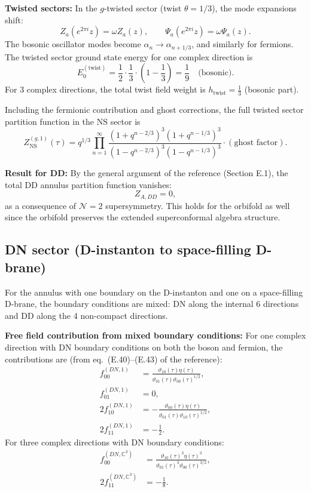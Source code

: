 \documentclass[11pt]{article}
\newcommand{\C}{\mathbb{C}}
\newcommand{\vt}{\vartheta}
\newcommand{\NN}{\mathcal{N}}
\begin{document}
\textbf{Twisted sectors:} In the $g$-twisted sector (twist $\theta = 1/3$), the mode expansions shift:
\begin{equation}
Z_a(e^{2\pi i} z) = \omega Z_a(z), \qquad \Psi_a(e^{2\pi i} z) = \omega \Psi_a(z).
\end{equation}
The bosonic oscillator modes become $\alpha_n \to \alpha_{n+1/3}$, and similarly for fermions. The twisted sector ground state energy for one complex direction is
\begin{equation}
E_0^{(\text{twist})} = \frac{1}{2} \cdot \frac{1}{3} \cdot \left(1 - \frac{1}{3}\right) = \frac{1}{9} \quad \text{(bosonic)}.
\end{equation}
For 3 complex directions, the total twist field weight is $h_{\text{twist}} = \frac{1}{3}$ (bosonic part).

Including the fermionic contribution and ghost corrections, the full twisted sector partition function in the NS sector is
\begin{equation}
Z^{(g,1)}_{\text{NS}}(\tau) = q^{1/3} \prod_{n=1}^\infty \frac{(1 + q^{n-2/3})^3(1 + q^{n-1/3})^3}{(1-q^{n-2/3})^3(1-q^{n-1/3})^3} \cdot (\text{ghost factor}).
\end{equation}

\textbf{Result for DD:} By the general argument of the reference (Section E.1), the total DD annulus partition function vanishes:
\begin{equation}
Z_{A,DD} = 0,
\end{equation}
as a consequence of $\NN=2$ supersymmetry. This holds for the orbifold as well since the orbifold preserves the extended superconformal algebra structure.

\subsection{DN sector (D-instanton to space-filling D-brane)}

For the annulus with one boundary on the D-instanton and one on a space-filling D-brane, the boundary conditions are mixed: DN along the internal 6 directions and DD along the 4 non-compact directions.

\textbf{Free field contribution from mixed boundary conditions:} For one complex direction with DN boundary conditions on both the boson and fermion, the contributions are (from eq.~(E.40)--(E.43) of the reference):
\begin{align}
f_{00}^{(DN,1)} &= \frac{\vt_{10}(\tau) \eta(\tau)}{\vt_{01}(\tau) \vt_{00}(\tau)^{1/2}}, \\
f_{01}^{(DN,1)} &= 0, \\
2f_{10}^{(DN,1)} &= -\frac{\vt_{00}(\tau) \eta(\tau)}{\vt_{01}(\tau) \vt_{10}(\tau)^{1/2}}, \\
2f_{11}^{(DN,1)} &= -\frac{1}{2}.
\end{align}
For three complex directions with DN boundary conditions:
\begin{align}
f_{00}^{(DN,\C^3)} &= \frac{\vt_{10}(\tau)^3 \eta(\tau)^3}{\vt_{01}(\tau)^3 \vt_{00}(\tau)^{3/2}}, \\
2f_{11}^{(DN,\C^3)} &= -\frac{1}{8}.
\end{align}
\end{document}
